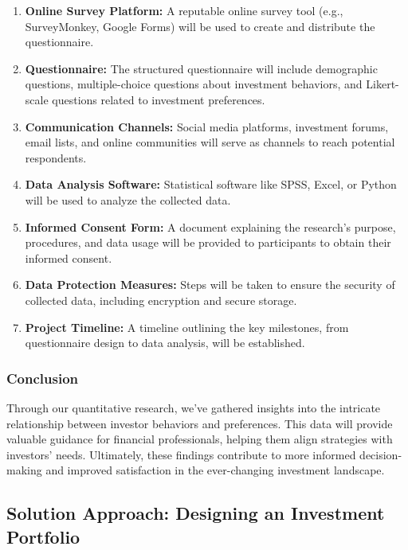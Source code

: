 \begin{enumerate}
    \item \textbf{Online Survey Platform:} A reputable online survey tool (e.g., SurveyMonkey, Google Forms) will be used to create and distribute the questionnaire.
    
    \item \textbf{Questionnaire:} The structured questionnaire will include demographic questions, multiple-choice questions about investment behaviors, and Likert-scale questions related to investment preferences.
    
    \item \textbf{Communication Channels:} Social media platforms, investment forums, email lists, and online communities will serve as channels to reach potential respondents.
    
    \item \textbf{Data Analysis Software:} Statistical software like SPSS, Excel, or Python will be used to analyze the collected data.
    
    \item \textbf{Informed Consent Form:} A document explaining the research's purpose, procedures, and data usage will be provided to participants to obtain their informed consent.
    
    \item \textbf{Data Protection Measures:} Steps will be taken to ensure the security of collected data, including encryption and secure storage.
    
    \item \textbf{Project Timeline:} A timeline outlining the key milestones, from questionnaire design to data analysis, will be established.
\end{enumerate}
\subsubsection{Conclusion}
Through our quantitative research, we've gathered insights into the intricate relationship between investor behaviors and preferences. This data will provide valuable guidance for financial professionals, helping them align strategies with investors' needs. Ultimately, these findings contribute to more informed decision-making and improved satisfaction in the ever-changing investment landscape.

\subsection{Solution Approach: Designing an Investment Portfolio}

